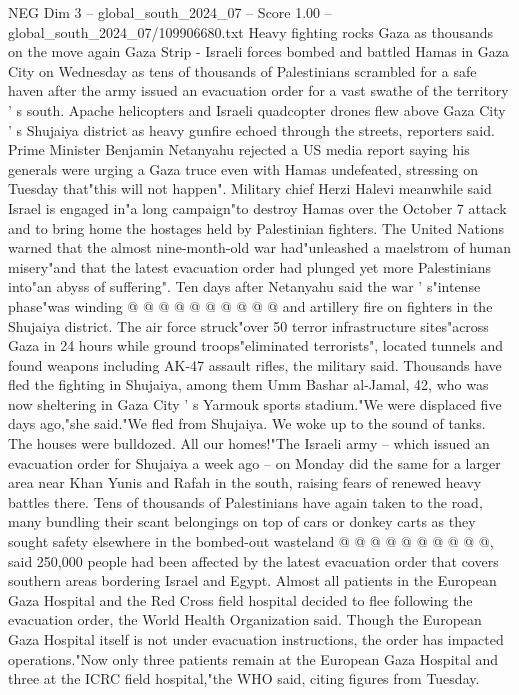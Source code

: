 \begin{textsample}{NEG Dim 3 – global\_south\_2024\_07 – Score 1.00 – global\_south\_2024\_07/109906680.txt}  \label{ex:f3_neg_150}
Heavy fighting rocks Gaza as thousands on the move again Gaza Strip - Israeli forces bombed and battled Hamas in Gaza City on Wednesday as tens of thousands of Palestinians scrambled for a safe haven after the army issued an evacuation order for a vast swathe of the territory ' s south.
Apache helicopters and Israeli quadcopter drones flew above Gaza City ' s Shujaiya district as heavy gunfire echoed through the streets, reporters said.
Prime Minister Benjamin Netanyahu rejected a US media report saying his generals were urging a Gaza truce even with Hamas undefeated, stressing on Tuesday that"this will not happen".
Military chief Herzi Halevi meanwhile said Israel is engaged in"a long campaign"to destroy Hamas over the October 7 attack and to bring home the hostages held by Palestinian fighters.
The United Nations warned that the almost nine-month-old war had"unleashed a maelstrom of human misery"and that the latest evacuation order had plunged yet more Palestinians into"an abyss of suffering".
Ten days after Netanyahu said the war ' s"intense phase"was winding @ @ @ @ @ @ @ @ @ @ and artillery fire on fighters in the Shujaiya district.
The air force struck"over 50 terror infrastructure sites"across Gaza in 24 hours while ground troops"eliminated terrorists", located tunnels and found weapons including AK-47 assault rifles, the military said.
Thousands have fled the fighting in Shujaiya, among them Umm Bashar al-Jamal, 42, who was now sheltering in Gaza City ' s Yarmouk sports stadium."We were displaced five days ago,"she said."We fled from Shujaiya.
We woke up to the sound of tanks.
The houses were bulldozed.
All our homes!"The Israeli army -- which issued an evacuation order for Shujaiya a week ago -- on Monday did the same for a larger area near Khan Yunis and Rafah in the south, raising fears of renewed heavy battles there.
Tens of thousands of Palestinians have again taken to the road, many bundling their scant belongings on top of cars or donkey carts as they sought safety elsewhere in the bombed-out wasteland @ @ @ @ @ @ @ @ @ @, said 250,000 people had been affected by the latest evacuation order that covers southern areas bordering Israel and Egypt.
Almost all patients in the European Gaza Hospital and the Red Cross field hospital decided to flee following the evacuation order, the World Health Organization said.
Though the European Gaza Hospital itself is not under evacuation instructions, the order has impacted operations."Now only three patients remain at the European Gaza Hospital and three at the ICRC field hospital,"the WHO said, citing figures from Tuesday.

\end{textsample}
